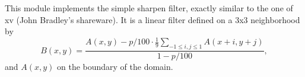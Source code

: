 This module implements the simple sharpen filter, 
exactly similar to the one of xv (John Bradley's shareware). 
It is a linear filter
defined on a 3x3 neighborhood by
$$ B(x,y) = 
\frac{\displaystyle A(x,y) - p/100 \cdot \frac 19 \sum_{-1\leq i,j\leq 1}A(x+i,y+j)}{1-p/100},$$
and $A(x,y)$ on the boundary of the domain.


